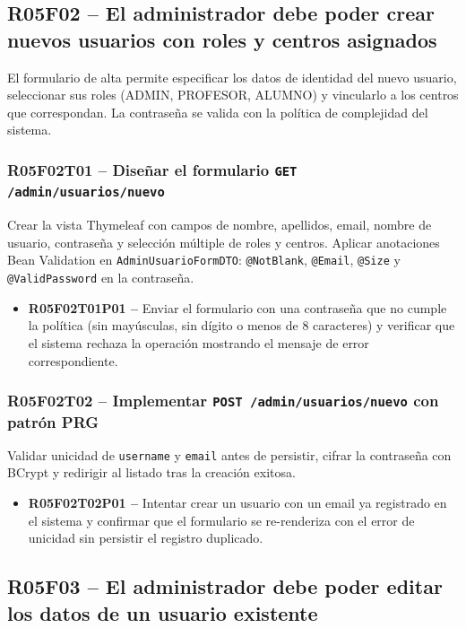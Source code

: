 \documentclass[12pt, a4paper]{report}
\begin{document}
\subsection{R05F02 -- El administrador debe poder crear nuevos usuarios con roles y centros asignados}

El formulario de alta permite especificar los datos de identidad del nuevo usuario, seleccionar sus roles (ADMIN, PROFESOR, ALUMNO) y vincularlo a los centros que correspondan. La contraseña se valida con la política de complejidad del sistema.

\subsubsection{R05F02T01 -- Diseñar el formulario \texttt{GET /admin/usuarios/nuevo}}
Crear la vista Thymeleaf con campos de nombre, apellidos, email, nombre de usuario, contraseña y selección múltiple de roles y centros. Aplicar anotaciones Bean Validation en \texttt{AdminUsuarioFormDTO}: \texttt{@NotBlank}, \texttt{@Email}, \texttt{@Size} y \texttt{@ValidPassword} en la contraseña.
\begin{itemize}
  \item \textbf{R05F02T01P01 --} Enviar el formulario con una contraseña que no cumple la política (sin mayúsculas, sin dígito o menos de 8 caracteres) y verificar que el sistema rechaza la operación mostrando el mensaje de error correspondiente.
\end{itemize}

\subsubsection{R05F02T02 -- Implementar \texttt{POST /admin/usuarios/nuevo} con patrón PRG}
Validar unicidad de \texttt{username} y \texttt{email} antes de persistir, cifrar la contraseña con BCrypt y redirigir al listado tras la creación exitosa.
\begin{itemize}
  \item \textbf{R05F02T02P01 --} Intentar crear un usuario con un email ya registrado en el sistema y confirmar que el formulario se re-renderiza con el error de unicidad sin persistir el registro duplicado.
\end{itemize}

\subsection{R05F03 -- El administrador debe poder editar los datos de un usuario existente}
\end{document}
